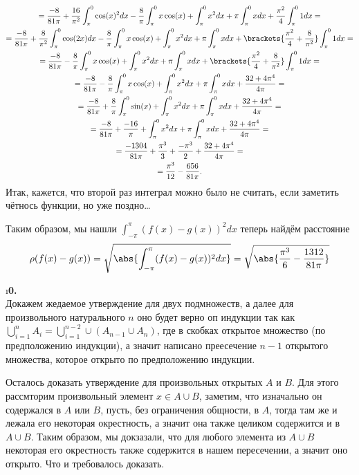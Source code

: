 \begin{gather*} 
    =\frac{-8}{81\pi} + \frac{16}{\pi^2}\int_{\pi}^0 \cos(x)^2dx - \frac{8}{\pi}\int_{\pi}^0 x\cos(x) + \int_{\pi}^0 x^2dx + \pi\int_{\pi}^0 xdx + \frac{\pi^2}{4}\int_{\pi}^0 1dx = \\ = 
    \frac{-8}{81\pi} + \frac{8}{\pi^2}\int_{\pi}^0 \cos(2x)dx - \frac{8}{\pi}\int_{\pi}^0 x\cos(x) + \int_{\pi}^0 x^2dx + \pi\int_{\pi}^0 xdx + \brackets{\frac{\pi^2}{4} + \frac{8}{\pi^2}}\int_{\pi}^0 1dx = \\ =
    \frac{-8}{81\pi} - \frac{8}{\pi}\int_{\pi}^0 x\cos(x) + \int_{\pi}^0 x^2dx + \pi\int_{\pi}^0 xdx + \brackets{\frac{\pi^2}{4} + \frac{8}{\pi^2}}\int_{\pi}^0 1dx = \\ =
    \frac{-8}{81\pi} - \frac{8}{\pi}\int_{\pi}^0 x\cos(x) + \int_{\pi}^0 x^2dx + \pi\int_{\pi}^0 xdx + \frac{32 + 4\pi^4}{4\pi} = \\ =
    \frac{-8}{81\pi} + \frac{8}{\pi}\int_{\pi}^0 \sin(x) + \int_{\pi}^0 x^2dx + \pi\int_{\pi}^0 xdx + \frac{32 + 4\pi^4}{4\pi} = \\ =
    \frac{-8}{81\pi} + \frac{-16}{\pi} + \int_{\pi}^0 x^2dx + \pi\int_{\pi}^0 xdx + \frac{32 + 4\pi^4}{4\pi} = \\ =
    \frac{-1304}{81\pi} + \frac{\pi^3}{3} + \frac{-\pi^3}{2} + \frac{32 + 4\pi^4}{4\pi} = \\ =
    \frac{\pi^3}{12} - \frac{656}{81\pi}.
\end{gather*}
Итак, кажется, что второй раз интеграл можно было не считать, если заметить чётнось функции, но уже поздно\ldots
\par Таким образом, мы нашли $\int_{-\pi}^\pi (f(x) - g(x))^2dx$ теперь найдём расстояние
\begin{gather*}
    \rho(f(x) - g(x)) = \sqrt{\abs{\int_{-\pi}^\pi (f(x) - g(x))^2dx}} = \sqrt{\abs{\frac{\pi^3}{6} - \frac{1312}{81\pi}}}
\end{gather*}


\i \textbf{0.}\\
Докажем жедаемое утверждение для двух подмножеств, а далее для произвольного натурального $n$ оно будет верно оп индукции так как $\bigcup_{i = 1}^n A_i = \bigcup_{i = 1}^{n-2} \cup (A_{n-1} \cup A_n)$, где в скобках открытое множество (по предположению индукции), а значит написано преесечение $n-1$ открытого множества, которое открыто по предположению индукции.
\par Осталось доказать утверждение для произвольных открытых $A$ и $B$. Для этого рассмторим произвольный элемент $x \in A \cup B$, заметим, что изначально он содержался в $A$ или $B$, пусть, без ограничения общности, в $A$, тогда там же и лежала его некоторая окрестность, а значит она также целиком содержится и в $A \cup B$. Таким образом, мы докзазали, что для любого элемента из $A \cup B$ некоторая его окрестность также содержится в нашем пересечении, а значит оно открыто. Что и требовалось доказать.


